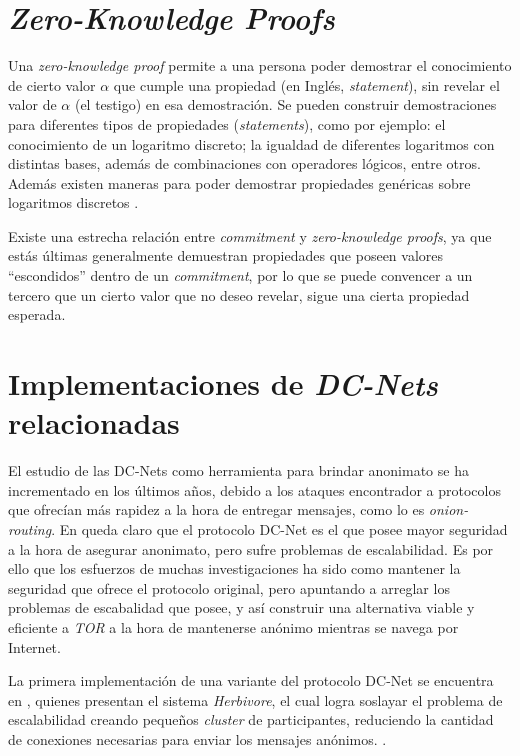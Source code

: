 \section{\emph{Zero-Knowledge Proofs}}

Una \emph{zero-knowledge proof} permite a una persona poder demostrar el conocimiento de cierto valor $\alpha$ que cumple una propiedad 
  (en Inglés, \emph{statement}), sin revelar el valor 
  de $\alpha$ (el testigo) en esa demostración.
Se pueden construir demostraciones para diferentes tipos de propiedades 
  (\emph{statements}), como por ejemplo: el conocimiento de un logaritmo 
  discreto; la igualdad de diferentes logaritmos con distintas bases, además de combinaciones con operadores lógicos, entre otros. 
Además existen maneras para poder demostrar propiedades genéricas sobre
  logaritmos discretos 
  \cite{camenisch1997proof}.
  
  
Existe una estrecha relación entre \emph{commitment} y \emph{zero-knowledge proofs}, ya que estás últimas generalmente demuestran propiedades que poseen valores ``escondidos'' dentro de un \emph{commitment}, por lo que se puede convencer a un tercero que un cierto valor que no deseo revelar, sigue una cierta propiedad esperada.

\section{Implementaciones de \emph{DC-Nets} relacionadas}

El estudio de las DC-Nets como herramienta para brindar anonimato se ha incrementado en los últimos años, debido a los ataques encontrador a protocolos que ofrecían más rapidez a la hora de entregar mensajes, como lo es \emph{onion-routing}. En \cite{wright2002analysis} queda claro que el protocolo DC-Net es el que posee mayor seguridad a la hora de asegurar anonimato, pero sufre problemas de escalabilidad. Es por ello que los esfuerzos de muchas investigaciones ha sido como mantener la seguridad que ofrece el protocolo original, pero apuntando a arreglar los problemas de escabalidad que posee, y así construir una alternativa viable y eficiente a \emph{TOR} a la hora de mantenerse anónimo mientras se navega por Internet.

La primera implementación de una variante del protocolo DC-Net se encuentra en \cite{goel2003herbivore}, quienes presentan el sistema \emph{Herbivore}, el cual logra soslayar el problema de escalabilidad creando pequeños \emph{cluster} de participantes, reduciendo la cantidad de conexiones necesarias para enviar los mensajes anónimos. .


